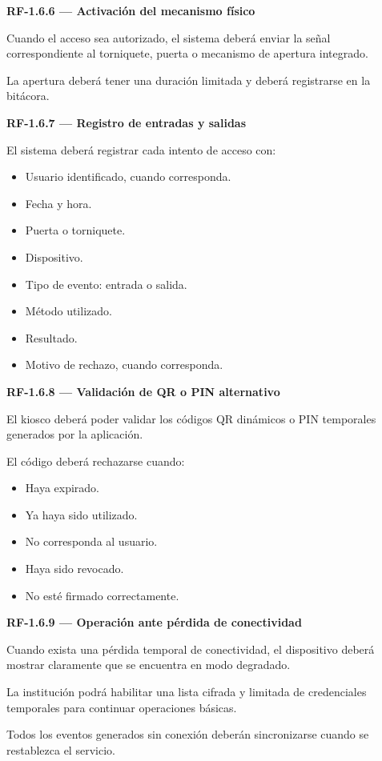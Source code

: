 \documentclass[12pt,a4paper]{article}
\newcommand{\RF}[1]{\textbf{\color{primary}RF-#1}}
\newenvironment{requisito}[1]
{
\begin{center}
\begin{minipage}{0.96\textwidth}
\colorbox{requirement}{
\begin{minipage}{0.94\textwidth}
\textbf{#1}
\end{minipage}
}
\vspace{2mm}
}
{
\end{minipage}
\end{center}
}
\begin{document}
\begin{requisito}{\RF{1.6.6} --- Activación del mecanismo físico}
Cuando el acceso sea autorizado, el sistema deberá enviar la señal correspondiente
al torniquete, puerta o mecanismo de apertura integrado.

La apertura deberá tener una duración limitada y deberá registrarse en la bitácora.
\end{requisito}

\begin{requisito}{\RF{1.6.7} --- Registro de entradas y salidas}
El sistema deberá registrar cada intento de acceso con:

\begin{itemize}[leftmargin=*]
\item Usuario identificado, cuando corresponda.
\item Fecha y hora.
\item Puerta o torniquete.
\item Dispositivo.
\item Tipo de evento: entrada o salida.
\item Método utilizado.
\item Resultado.
\item Motivo de rechazo, cuando corresponda.
\end{itemize}
\end{requisito}

\begin{requisito}{\RF{1.6.8} --- Validación de QR o PIN alternativo}
El kiosco deberá poder validar los códigos QR dinámicos o PIN temporales
generados por la aplicación.

El código deberá rechazarse cuando:

\begin{itemize}[leftmargin=*]
\item Haya expirado.
\item Ya haya sido utilizado.
\item No corresponda al usuario.
\item Haya sido revocado.
\item No esté firmado correctamente.
\end{itemize}
\end{requisito}

\begin{requisito}{\RF{1.6.9} --- Operación ante pérdida de conectividad}
Cuando exista una pérdida temporal de conectividad, el dispositivo deberá mostrar
claramente que se encuentra en modo degradado.

La institución podrá habilitar una lista cifrada y limitada de credenciales
temporales para continuar operaciones básicas.

Todos los eventos generados sin conexión deberán sincronizarse cuando se
restablezca el servicio.
\end{requisito}
\end{document}
